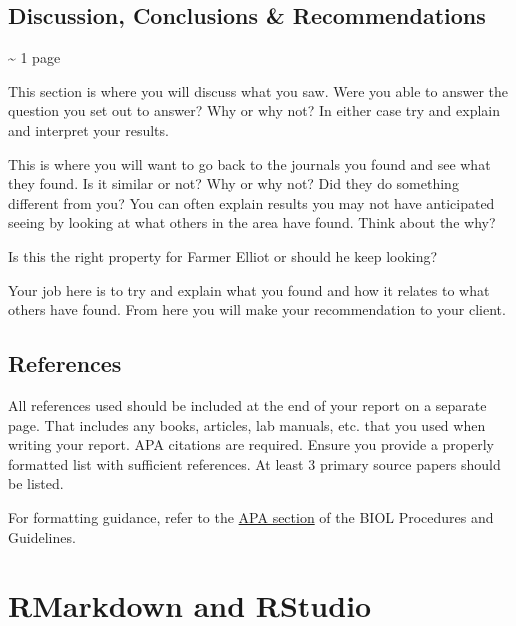 \documentclass[
]{book}
\begin{document}
\hypertarget{discussion-conclusions-recommendations}{%
\subsection*{Discussion, Conclusions \& Recommendations}\label{discussion-conclusions-recommendations}}

\textasciitilde{} 1 page

This section is where you will discuss what you saw. Were you able to answer the question you set out to answer? Why or why not? In either case try and explain and interpret your results.

This is where you will want to go back to the journals you found and see what they found. Is it similar or not? Why or why not? Did they do something different from you? You can often explain results you may not have anticipated seeing by looking at what others in the area have found. Think about the why?

Is this the right property for Farmer Elliot or should he keep looking?

Your job here is to try and explain what you found and how it relates to what others have found. From here you will make your recommendation to your client.

\hypertarget{references}{%
\subsection*{References}\label{references}}

All references used should be included at the end of your report on a separate page. That includes any books, articles, lab manuals, etc. that you used when writing your report. APA citations are required. Ensure you provide a properly formatted list with sufficient references. At least 3 primary source papers should be listed.

For formatting guidance, refer to the \href{https://ubco-biology.github.io/Procedures-and-Guidelines/apa-citations.html}{APA section} of the BIOL Procedures and Guidelines.

\hypertarget{rmarkdown-and-rstudio}{%
\section*{RMarkdown and RStudio}\label{rmarkdown-and-rstudio}}
\end{document}
